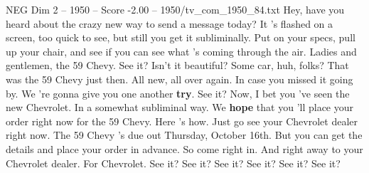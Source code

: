 \begin{textsample}{NEG Dim 2 – 1950 – Score -2.00 – 1950/tv\_com\_1950\_84.txt}  \label{ex:f2_neg_089}
Hey, have you heard about the crazy new way to send a message today?
It 's flashed on a screen, too quick to see, but still you get it subliminally.
Put on your specs, pull up your chair, and see if you can see what 's coming through the air.
Ladies and gentlemen, the 59 Chevy.
See it?
Isn't it beautiful?
Some car, huh, folks?
That was the 59 Chevy just then.
All new, all over again.
In case you missed it going by.
We 're gonna give you one another \textbf{try}.
See it?
Now, I bet you 've seen the new Chevrolet.
In a somewhat subliminal way.
We \textbf{hope} that you 'll place your order right now for the 59 Chevy.
Here 's how.
Just go see your Chevrolet dealer right now.
The 59 Chevy 's due out Thursday, October 16th.
But you can get the details and place your order in advance.
So come right in.
And right away to your Chevrolet dealer.
For Chevrolet.
See it?
See it?
See it?
See it?
See it?
See it?

\end{textsample}

